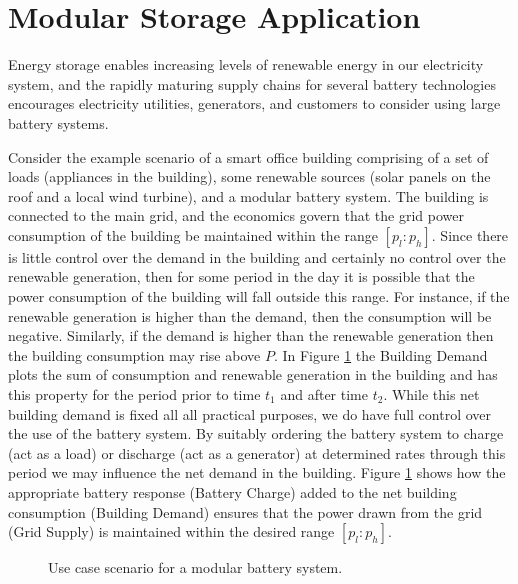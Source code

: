 \section{Modular Storage Application}\label{sec:introduction}

Energy storage enables increasing levels of renewable energy in our electricity system, and the rapidly maturing supply chains for several battery technologies encourages electricity utilities, generators, and customers to consider using large battery systems. 

Consider the example scenario of a smart office building comprising of a set of loads (appliances in the building), some renewable sources (solar panels on the roof and a local wind turbine), and a modular battery system. The building is connected to the main grid, and the economics govern that the grid power consumption of the building be maintained within the range $[p_l:p_h]$. Since there is little control over the demand in the building and certainly no control over the renewable generation, then for some period in the day it is possible that the power consumption of the building will fall outside this range. For instance, if the renewable generation is higher than the demand, then the consumption will be negative. Similarly, if the demand is higher than the renewable generation then the building consumption may rise above $P$. In Figure \ref{fig:usecase} the Building Demand plots the sum of consumption and renewable generation in the building and has this property for the period prior to time $t_1$ and after time $t_2$. While this net building demand is fixed all all practical purposes, we do have full control over the use of the battery system. By suitably ordering the battery system to charge (act as a load) or discharge (act as a generator) at determined rates through this period we may influence the net demand in the building. Figure \ref{fig:usecase} shows how the appropriate battery response (Battery Charge) added to the net building consumption (Building Demand) ensures that the power drawn from the grid (Grid Supply) is maintained within the desired range $[p_l:p_h]$.

\begin{figure}[ht]
\begin{center}

\end{center}
\caption{Use case scenario for a modular battery system.}
\label{fig:usecase}
\end{figure}

